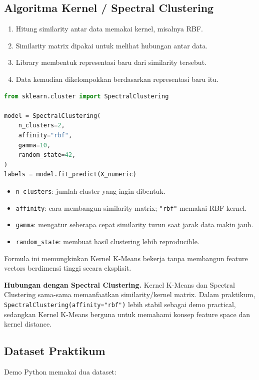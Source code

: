 \documentclass{article}
\newcommand{\code}[1]{\texttt{#1}}
\newcommand{\infobox}[2]{%
  \par\vspace{0.6em}
  \noindent\colorbox{#1}{%
    \begin{minipage}{0.96\textwidth}
    \vspace{0.65em}
    #2
    \vspace{0.65em}
    \end{minipage}}
  \par\vspace{0.8em}
}
\begin{document}
\subsection{Algoritma Kernel / Spectral Clustering}
\begin{enumerate}[leftmargin=*]
    \item Hitung similarity antar data memakai kernel, misalnya RBF.
    \item Similarity matrix dipakai untuk melihat hubungan antar data.
    \item Library membentuk representasi baru dari similarity tersebut.
    \item Data kemudian dikelompokkan berdasarkan representasi baru itu.
\end{enumerate}
\begin{lstlisting}[language=Python]
from sklearn.cluster import SpectralClustering

model = SpectralClustering(
    n_clusters=2,
    affinity="rbf",
    gamma=10,
    random_state=42,
)
labels = model.fit_predict(X_numeric)
\end{lstlisting}
\begin{itemize}[leftmargin=*]
    \item \code{n\_clusters}: jumlah cluster yang ingin dibentuk.
    \item \code{affinity}: cara membangun similarity matrix; \code{"rbf"} memakai RBF kernel.
    \item \code{gamma}: mengatur seberapa cepat similarity turun saat jarak data makin jauh.
    \item \code{random\_state}: membuat hasil clustering lebih reproducible.
\end{itemize}

Formula ini memungkinkan Kernel K-Means bekerja tanpa membangun feature vectors berdimensi tinggi secara eksplisit.
\infobox{softBlue}{\textbf{Hubungan dengan Spectral Clustering.} Kernel K-Means dan Spectral Clustering sama-sama memanfaatkan similarity/kernel matrix. Dalam praktikum, \code{SpectralClustering(affinity="rbf")} lebih stabil sebagai demo practical, sedangkan Kernel K-Means berguna untuk memahami konsep feature space dan kernel distance.}

\subsection{Dataset Praktikum}

Demo Python memakai dua dataset:
\end{document}
